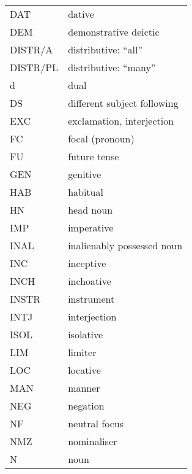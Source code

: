\begin{tabular}{ll}
DAT & dative \\
DEM & demonstrative deictic \\
DISTR/A & distributive: ``all'' \\
DISTR/PL & distributive: ``many'' \\
d & dual \\
DS & different subject following \\
EXC & exclamation, interjection \\
FC & focal (pronoun) \\
FU & future tense \\
GEN & genitive \\
HAB & habitual \\
HN & head noun \\
IMP & imperative \\
INAL & inalienably possessed noun \\
INC & inceptive \\
INCH & inchoative \\
INSTR & instrument \\
INTJ & interjection \\
ISOL & isolative \\
LIM & limiter \\
LOC & locative \\
MAN & manner \\
NEG & negation \\
NF & neutral focus \\
NMZ & nominaliser \\
N & noun \\
\end{tabular}

